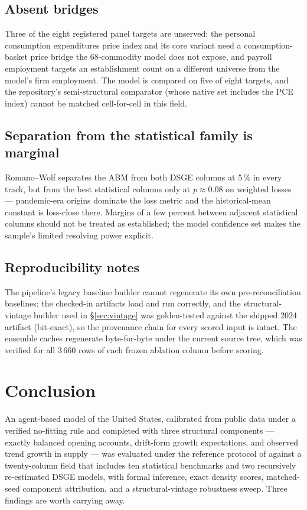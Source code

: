 \documentclass[11pt,a4paper]{article}
\begin{document}
\subsection{Absent bridges}
Three of the eight registered panel targets are unserved: the personal consumption expenditures
price index and its core variant need a consumption-basket price bridge the 68-commodity model
does not expose, and payroll employment targets an establishment count on a different universe
from the model's firm employment. The model is compared on five of eight targets, and the
repository's semi-structural comparator (whose native set includes the PCE index) cannot be
matched cell-for-cell in this field.

\subsection{Separation from the statistical family is marginal}
Romano--Wolf separates the ABM from both DSGE columns at 5\,\% in every track, but from the best
statistical columns only at $p \approx 0.08$ on weighted losses --- pandemic-era origins dominate
the loss metric and the historical-mean constant is loss-close there. Margins of a few percent
between adjacent statistical columns should not be treated as established; the model confidence
set makes the sample's limited resolving power explicit.

\subsection{Reproducibility notes}
The pipeline's legacy baseline builder cannot regenerate its own pre-reconciliation baselines;
the checked-in artifacts load and run correctly, and the structural-vintage builder used in
\S\ref{sec:vintage} was golden-tested against the shipped 2024 artifact (bit-exact), so the
provenance chain for every scored input is intact. The ensemble caches regenerate byte-for-byte
under the current source tree, which was verified for all 3\,660 rows of each frozen ablation
column before scoring.

\FloatBarrier
\section{Conclusion}
\label{sec:conclusion}

An agent-based model of the United States, calibrated from public data under a verified
no-fitting rule and completed with three structural components --- exactly balanced opening
accounts, drift-form growth expectations, and observed trend growth in supply --- was evaluated
under the reference protocol of \citet{poledna2023} against a twenty-column field that includes
ten statistical benchmarks and two recursively re-estimated DSGE models, with formal inference,
exact density scores, matched-seed component attribution, and a structural-vintage robustness
sweep. Three findings are worth carrying away.
\end{document}
